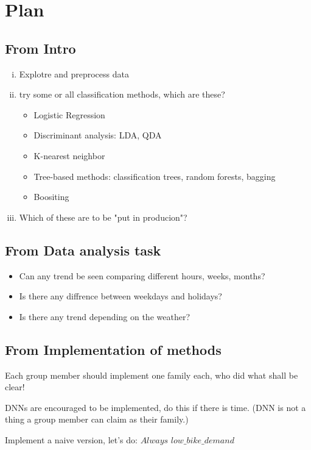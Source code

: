 \section{Plan}
\subsection{From Intro}

\begin{enumerate}[(i)]
    \item Explotre and preprocess data
    \item try some or all classification methods, which are these?
    \begin{itemize}
        \item Logistic Regression
        \item Discriminant analysis: LDA, QDA
        \item K-nearest neighbor
        \item Tree-based methods: classification trees, random forests, bagging
        \item Boositing
    \end{itemize} 
    \item Which of these are to be "put in producion"?
\end{enumerate}

\subsection{From Data analysis task}
\begin{itemize}
    \item Can any trend be seen comparing different hours, weeks, months?
    \item Is there any diffrence between weekdays and holidays?
    \item Is there any trend depending on the weather?
\end{itemize}

\subsection{From Implementation of methods}

Each group member should implement one family each, who did what shall be clear!

DNNs are encouraged to be implemented, do this if there is time. 
(DNN is not a thing a group member can claim as their family.)

Implement a naive version, let's do: $\textit{Always low\_bike\_demand}$
